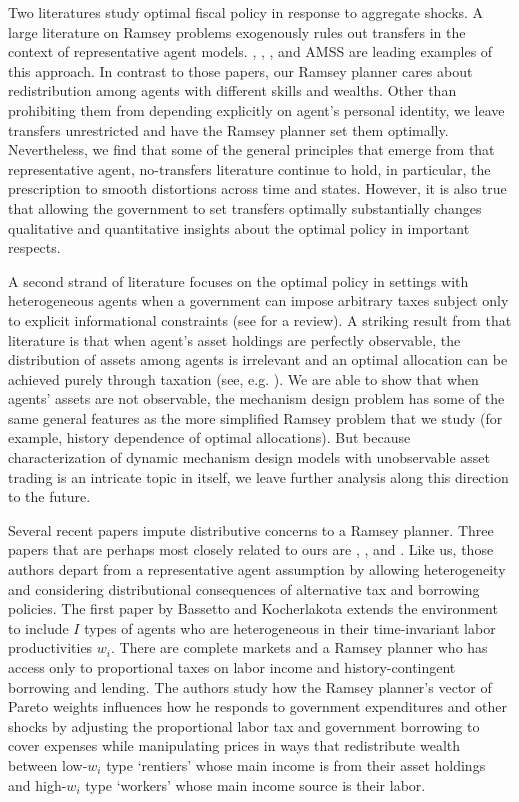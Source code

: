 \documentclass[thmsb,11pt]{article}
\begin{document}
Two literatures study optimal fiscal policy in
response to  aggregate shocks. A large  literature on Ramsey problems  exogenously rules out transfers in
the context of
representative agent models.
 \citet{Barro1979}, \citet{LucasJr.1983}, \citet{Chari1994},  and AMSS are leading  examples of this approach.
In contrast to those papers, our Ramsey planner cares about redistribution among
agents with different skills and wealths. Other than prohibiting them from depending explicitly
on agent's personal identity, we leave   transfers unrestricted and have the Ramsey planner set
them optimally. Nevertheless, we find that  some of the general principles that emerge from that
representative agent, no-transfers literature continue to hold, in particular, the prescription to
smooth distortions across time and states.  However, it is also true that
allowing the government to set transfers optimally substantially changes
qualitative and quantitative insights about the optimal policy in important respects.

A second strand of literature focuses on the optimal policy in settings with
heterogeneous agents when a government can impose arbitrary taxes subject only
to explicit informational constraints (see \citet{golosov2007new} for a review). A striking result from that literature
is that when  agent's asset holdings are perfectly observable, the distribution of assets among
agents is irrelevant and an optimal allocation can be achieved purely through
taxation (see, e.g. \citet{Bassetto2004}).   We are able to show that when
agents' assets are not observable, the mechanism design problem has some of
the same general features as the more simplified Ramsey problem that we
study (for example, history dependence of optimal allocations).  But because  characterization of dynamic mechanism design models with
unobservable asset trading is an intricate topic in itself, we leave further analysis along this
direction to the  future.

Several recent papers impute distributive concerns to a Ramsey planner.
Three papers that are perhaps most closely related to ours are \citet{Bassetto2004}, \citet{shin2006ramsey}, and \citet{Wer07a}. Like us, those authors depart from
a representative agent assumption by allowing heterogeneity and considering
distributional consequences of alternative tax and borrowing policies.
The first paper by Bassetto and Kocherlakota  extends the \citet{LucasJr.1983} environment to include $I$ types of
agents who are heterogeneous in their time-invariant labor productivities $%
w_{i}$. There are complete markets and a Ramsey planner who has access only
to proportional taxes on labor income and history-contingent borrowing and
lending. The authors study how the Ramsey planner's vector of Pareto weights
influences how he responds to government expenditures and other shocks by
adjusting the proportional labor tax and government borrowing to cover
expenses while manipulating prices in ways that redistribute wealth between
low-$w_{i}$ type `rentiers' whose main income is from their asset holdings
and high-$w_{i}$ type `workers' whose main income source is their labor.
\end{document}
